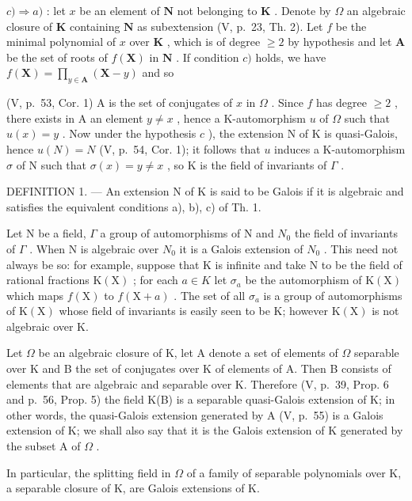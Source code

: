 \(c) \Rightarrow a)\) : let \(x\) be an element of \(\mathbf{N}\) not belonging to \(\mathbf{K}\) . Denote by \(\Omega\) an algebraic closure of \(\mathbf{K}\) containing \(\mathbf{N}\) as subextension (V, p.~23, Th. 2). Let \(f\) be the minimal polynomial of \(x\) over \(\mathbf{K}\) , which is of degree \(\geqslant 2\) by hypothesis and let \(\mathbf{A}\) be the set of roots of \(f(\mathbf{X})\) in \(\mathbf{N}\) . If condition \(c)\) holds, we have \(f(\mathbf{X}) = \prod_{y \in \mathbf{A}} (\mathbf{X} - y)\) and so

(V, p.~53, Cor. 1) A is the set of conjugates of \(x\) in \(\Omega\) . Since \(f\) has degree \(\geqslant 2\) , there exists in A an element \(y \neq x\) , hence a K-automorphism \(u\) of \(\Omega\) such that \(u(x) = y\) . Now under the hypothesis \(c\) ), the extension N of K is quasi-Galois, hence \(u(N) = N\) (V, p.~54, Cor. 1); it follows that \(u\) induces a K-automorphism \(\sigma\) of N such that \(\sigma(x) = y \neq x\) , so K is the field of invariants of \(\Gamma\) .

DEFINITION 1. --- An extension N of K is said to be Galois if it is algebraic and satisfies the equivalent conditions a), b), c) of Th. 1.

Let N be a field, \(\Gamma\) a group of automorphisms of N and \(N_{0}\) the field of invariants of \(\Gamma\) . When N is algebraic over \(N_{0}\) it is a Galois extension of \(N_{0}\) . This need not always be so: for example, suppose that K is infinite and take N to be the field of rational fractions \(\mathrm{K}(\mathrm{X})\) ; for each \(a \in K\) let \(\sigma_{a}\) be the automorphism of \(\mathrm{K}(\mathrm{X})\) which maps \(f(\mathrm{X})\) to \(f(\mathrm{X} + a)\) . The set of all \(\sigma_{a}\) is a group of automorphisms of \(\mathrm{K}(\mathrm{X})\) whose field of invariants is easily seen to be K; however \(\mathrm{K}(\mathrm{X})\) is not algebraic over K.

Let \(\Omega\) be an algebraic closure of K, let A denote a set of elements of \(\Omega\) separable over K and B the set of conjugates over K of elements of A. Then B consists of elements that are algebraic and separable over K. Therefore (V, p.~39, Prop. 6 and p.~56, Prop. 5) the field K(B) is a separable quasi-Galois extension of K; in other words, the quasi-Galois extension generated by A (V, p.~55) is a Galois extension of K; we shall also say that it is the Galois extension of K generated by the subset A of \(\Omega\) .

In particular, the splitting field in \(\Omega\) of a family of separable polynomials over K, a separable closure of K, are Galois extensions of K.


